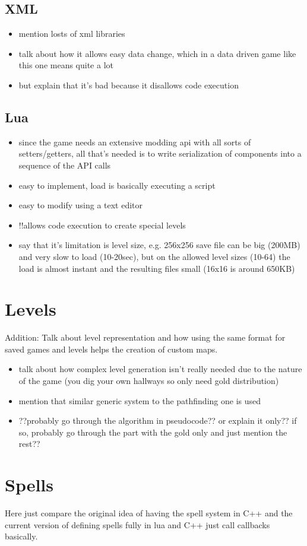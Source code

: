 \subsection{XML}

\begin{itemize}
    \item mention losts of xml libraries
    \item talk about how it allows easy data change, which in a data driven game like this
	    one means quite a lot
    \item but explain that it's bad because it disallows code execution
\end{itemize}

\subsection{Lua}

\begin{itemize}
    \item since the game needs an extensive modding api with all sorts of setters/getters,
	    all that's needed is to write serialization of components into a sequence of
	    the API calls
    \item easy to implement, load is basically executing a script
    \item easy to modify using a text editor
    \item !!allows code execution to create special levels
    \item say that it's limitation is level size, e.g. 256x256 save file can be big (200MB) and
	    very slow to load (10-20sec), but on the allowed level sizes (10-64) the load
	    is almost instant and the resulting files small (16x16 is around 650KB)
\end{itemize}

\section{Levels}

Addition: Talk about level representation and how using the same
format for saved games and levels helps the creation of custom maps.

\begin{itemize}
    \item talk about how complex level generation isn't really needed due
	    to the nature of the game (you dig your own hallways so only need
	    gold distribution)
    \item mention that similar generic system to the pathfinding one is used
    \item ??probably go through the algorithm in pseudocode?? or explain it only??
	    if so, probably go through the part with the gold only and just mention
	    the rest??
\end{itemize}

\section{Spells}

Here just compare the original idea of having the spell system in C++ and the current version
of defining spells fully in lua and C++ just call callbacks basically.

\fi

